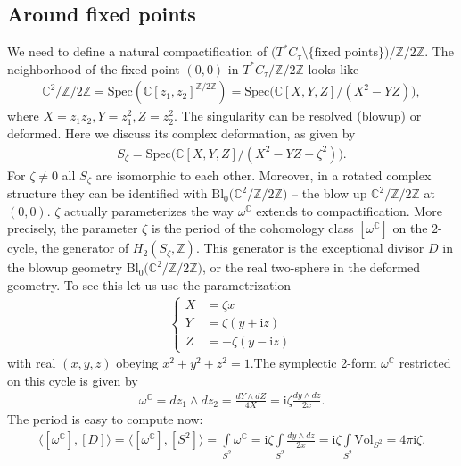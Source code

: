 \documentclass[12pt]{article}
\numberwithin{equation}{section}
\theoremstyle{definition}
\newcommand {\ii} {\mathrm{i}}
\begin{document}
\subsection{Around fixed points}
We need to define a natural compactification of $\big( T^{*}C_{\tau} \setminus \{\text{fixed points}\} \big) \big/ \mathbb{Z}/2\mathbb{Z}$.
The neighborhood of the fixed point $(0, 0)$ in $T^{*}C_{\tau} \big/ \mathbb{Z}/2\mathbb{Z}$ looks like
\begin{align*}
    \mathbb{C}^2 \big/ \mathbb{Z}/2\mathbb{Z} = \mathrm{Spec} (\mathbb{C}[z_1, z_2]^{\mathbb{Z}/2\mathbb{Z}}) = \mathrm{Spec} \big( \mathbb{C}[X, Y, Z] \big/ (X^2 - YZ) \big),
\end{align*}
where $X = z_1 z_2, Y = z_1^2, Z = z_2^2$.
The  singularity can be resolved (blowup) or deformed. Here we discuss its complex deformation, as  given by
\begin{align*}
    S_{\zeta} = \mathrm{Spec} \big( \mathbb{C}[X, Y, Z] \big/ (X^2 - YZ - \zeta^2) \big).
\end{align*}
For $\zeta \neq 0$ all $S_{\zeta}$ are isomorphic to each other. Moreover, in a rotated complex structure they can be identified with $\mathrm{Bl}_0 \big( \mathbb{C}^2 \big/ \mathbb{Z}/2\mathbb{Z} \big)$ -- the blow up $\mathbb{C}^2 \big/ \mathbb{Z}/2\mathbb{Z}$ at $(0, 0)$. $\zeta$ actually parameterizes the way $\omega^{\mathbb{C}}$ extends to compactification. More precisely, the parameter $\zeta$ is the period of the cohomology class $[\omega^{\mathbb{C}}]$ on the $2$-cycle, the generator of $H_{2}(S_{\zeta}, \mathbb{Z})$. This generator is the exceptional divisor $D$ in the blowup geometry $\mathrm{Bl}_0 \big( \mathbb{C}^2 \big/ \mathbb{Z}/2\mathbb{Z} \big)$, or the real two-sphere in the deformed geometry. To see this let us  use the parametrization
\begin{align*}
\begin{cases}
      X &= \zeta x\\
    Y &= \zeta (y + {\ii} z)\\
    Z &= -\zeta (y - {\ii} z)
\end{cases}
\end{align*}
with real $(x,y,z)$ obeying $x^2 + y^2 + z^2 = 1$.The symplectic 2-form $\omega^{\mathbb{C}}$ restricted on this cycle is given by
\begin{align*}
      \omega^{\mathbb{C}} = d z_1 \wedge d z_2 = \frac{d Y \wedge d Z}{4 X} = {\ii} \zeta \frac{dy \wedge dz}{2x}.
\end{align*}
The period is easy to compute now:
\begin{align*}
    \langle [\omega^{\mathbb{C}}], [D] \rangle =  \langle [\omega^{\mathbb{C}}], [S^2] \rangle =
    \int\limits_{S^2} \omega^{\mathbb{C}} = {\ii} \zeta \int\limits_{S^2}\frac{dy \wedge dz}{2x} = {\ii} \zeta \int\limits_{S^2}\mathrm{Vol}_{S^2} = 4 \pi {\ii} \zeta.
\end{align*}
\end{document}
